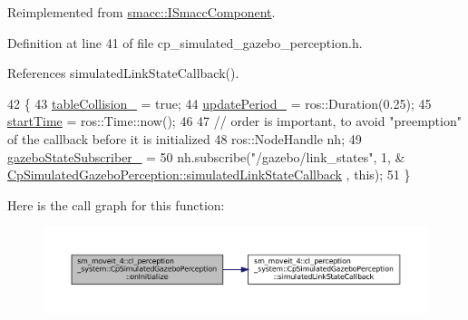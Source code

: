 Reimplemented from \hyperlink{classsmacc_1_1ISmaccComponent_ae6f71d008db12553912e9436184b9e65}{smacc\+::\+I\+Smacc\+Component}.



Definition at line 41 of file cp\+\_\+simulated\+\_\+gazebo\+\_\+perception.\+h.



References simulated\+Link\+State\+Callback().


\begin{DoxyCode}
42             \{                
43                 \hyperlink{classsm__moveit__4_1_1cl__perception__system_1_1CpSimulatedGazeboPerception_a64beecc85d97c62bc4f884f4601d9c6a}{tableCollision\_} = \textcolor{keyword}{true};
44                 \hyperlink{classsm__moveit__4_1_1cl__perception__system_1_1CpSimulatedGazeboPerception_a185c4065558b0c320d73f366bb6b8277}{updatePeriod\_} = ros::Duration(0.25);
45                 \hyperlink{classsm__moveit__4_1_1cl__perception__system_1_1CpSimulatedGazeboPerception_af27dcb3530d5f2e8919f5e617b46275c}{startTime} = ros::Time::now();
46                 
47                 \textcolor{comment}{// order is important, to avoid "preemption" of the callback before it is initialized}
48                 ros::NodeHandle nh;
49                 \hyperlink{classsm__moveit__4_1_1cl__perception__system_1_1CpSimulatedGazeboPerception_a0808beb5b57079d863a56258279e202f}{gazeboStateSubscriber\_} =
50                     nh.subscribe(\textcolor{stringliteral}{"/gazebo/link\_states"}, 1, &
      \hyperlink{classsm__moveit__4_1_1cl__perception__system_1_1CpSimulatedGazeboPerception_a7914ffd20518c866a8a1e11254589d12}{CpSimulatedGazeboPerception::simulatedLinkStateCallback}
      , \textcolor{keyword}{this});
51             \}
\end{DoxyCode}
Here is the call graph for this function\+:
\nopagebreak
\begin{figure}[H]
\begin{center}
\leavevmode
\includegraphics[width=350pt]{classsm__moveit__4_1_1cl__perception__system_1_1CpSimulatedGazeboPerception_adebc30f6b1fc905f783de3f7bdf4a711_cgraph}
\end{center}
\end{figure}
\mbox{\label{classsm__moveit__4_1_1cl__perception__system_1_1CpSimulatedGazeboPerception_a643fa78620216085ca385b74832a0abc}} 
